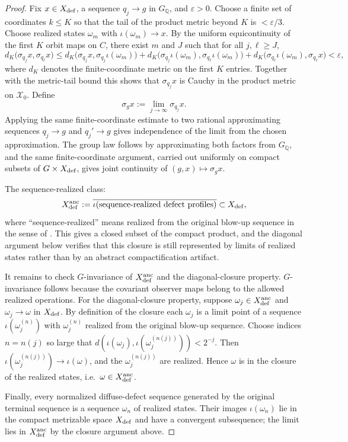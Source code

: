 \documentclass[11pt]{amsart}
\numberwithin{equation}{section}
\theoremstyle{plain}
\theoremstyle{definition}
\theoremstyle{remark}
\begin{document}
\begin{proof}
Fix \(x\in X_{\rm def}\), a sequence \(q_j\to g\) in \(G_{\mathbb Q}\), and
\(\varepsilon>0\).  Choose a finite set of coordinates \(k\le K\) so that the
tail of the product metric beyond \(K\) is \(<\varepsilon/3\).  Choose realized
states \(\omega_m\) with \(\iota(\omega_m)\to x\).  By the uniform
equicontinuity of the first \(K\) orbit maps on \(C\), there exist \(m\) and
\(J\) such that for all \(j,\ell\ge J\),
\[
   d_K\bigl(\sigma_{q_j}x,\sigma_{q_\ell}x\bigr)
   \le
   d_K\bigl(\sigma_{q_j}x,\sigma_{q_j}\iota(\omega_m)\bigr)
   +d_K\bigl(\sigma_{q_j}\iota(\omega_m),\sigma_{q_\ell}\iota(\omega_m)\bigr)
   +d_K\bigl(\sigma_{q_\ell}\iota(\omega_m),\sigma_{q_\ell}x\bigr)
   <\varepsilon ,
\]
where \(d_K\) denotes the finite-coordinate metric on the first \(K\) entries.
Together with the metric-tail bound this shows that \(\sigma_{q_j}x\) is Cauchy
in the product metric on \(\mathcal X_0\).  Define
\[
   \sigma_gx:=\lim_{j\to\infty}\sigma_{q_j}x .
\]
Applying the same finite-coordinate estimate to two rational approximating
sequences \(q_j\to g\) and \(q_j'\to g\) gives independence of the limit from
the chosen approximation.  The group law follows by approximating both factors
from \(G_{\mathbb Q}\), and the same finite-coordinate argument, carried out
uniformly on compact subsets of \(G\times X_{\rm def}\), gives joint continuity
of \((g,x)\mapsto\sigma_gx\).

The sequence-realized class:
\[
   X_{\rm def}^{\rm anc}
   :=
   \overline{\iota(\text{sequence-realized defect profiles})}
   \subset X_{\rm def} ,
\]
where ``sequence-realized'' means realized from the original blow-up
sequence in the sense of
.  This gives a closed subset of
the compact product, and the diagonal argument below verifies that this closure
is still represented by limits of realized states rather than by an abstract
compactification artifact.

It remains to check \(G\)-invariance of \(X_{\rm def}^{\rm anc}\) and the
diagonal-closure property.  \(G\)-invariance follows because the covariant
observer maps belong to the allowed realized operations.  For the
diagonal-closure property, suppose \(\omega_j\in X_{\rm def}^{\rm anc}\) and
\(\omega_j\to\omega\) in \(X_{\rm def}\).  By definition of the closure each
\(\omega_j\) is a limit point of a sequence \(\iota(\omega_j^{(n)})\) with
\(\omega_j^{(n)}\) realized from the original blow-up sequence.  Choose
indices \(n=n(j)\) so large that \(d(\iota(\omega_j),\iota(\omega_j^{(n(j))}))
<2^{-j}\).  Then \(\iota(\omega_j^{(n(j))})\to\iota(\omega)\), and the
\(\omega_j^{(n(j))}\) are realized.  Hence \(\omega\) is in the closure of
the realized states, i.e.\ \(\omega\in X_{\rm def}^{\rm anc}\).

Finally, every normalized diffuse-defect sequence generated by the original
terminal sequence is a sequence \(\omega_n\) of realized states.  Their
images \(\iota(\omega_n)\) lie in the compact metrizable space
\(X_{\rm def}\) and have a convergent subsequence; the limit lies in
\(X_{\rm def}^{\rm anc}\) by the closure argument above.
\end{proof}
\end{document}
